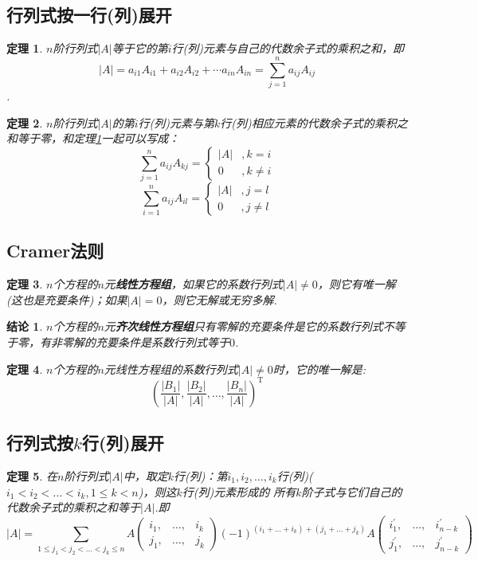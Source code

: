 \documentclass[UTF8]{article}
\newtheorem{thrm}{定理}[subsection]
\newtheorem{ccl}{结论}[subsection]
\begin{document}
\subsection{行列式按一行(列)展开}
\begin{thrm}\label{thrm:238}
  $n$阶行列式$|A|$等于它的第$i$行(列)元素与自己的代数余子式的乘积之和，即
  $$|A|=a_{i1}A_{i1}+a_{i2}A_{i2}+\cdots a_{in}A_{in}=\sum\limits_{j=1}^na_{ij}A_{ij}$$.
\end{thrm}
\begin{thrm}
  $n$阶行列式$|A|$的第$i$行(列)元素与第$k$行(列)相应元素的代数余子式的乘积之和等于零，和定理\ref{thrm:238}一起可以写成：
  \[
  \sum_{j=1}^na_{ij}A_{kj}=
  \begin{cases}
    |A| &,k=i \\
    0 &,k\ne i
  \end{cases}
  \]
  \[
  \sum_{i=1}^na_{ij}A_{il}=
  \begin{cases}
    |A| &,j=l \\
    0 &,j\ne l
  \end{cases}
  \]
\end{thrm}

\subsection{Cramer法则}
\begin{thrm}
  $n$个方程的$n$元\textbf{线性方程组}，如果它的系数行列式$|A|\ne 0$，则它有唯一解(这也是充要条件)；如果$|A|=0$，则它无解或无穷多解.
\end{thrm}
\begin{ccl}
  $n$个方程的$n$元\textbf{齐次线性方程组}只有零解的充要条件是它的系数行列式不等于零，有非零解的充要条件是系数行列式等于$0$.
\end{ccl}
\begin{thrm}
  $n$个方程的$n$元线性方程组的系数行列式$|A|\ne 0$时，它的唯一解是:
  \[
  \left( \frac{|B_1|}{|A|},\frac{|B_2|}{|A|},\ldots,\frac{|B_n|}{|A|} \right)^\mathrm{T}
  \]
\end{thrm}

\subsection{行列式按$k$行(列)展开}
\begin{thrm}
  在$n$阶行列式$|A|$中，取定$k$行(列)：第$i_1,i_2,\ldots,i_k$行(列)($i_1<i_2<\ldots<i_k,1\le k<n$)，则这$k$行(列)元素形成的
  所有$k$阶子式与它们自己的代数余子式的乘积之和等于$|A|$.即
  \[
  |A|=\sum_{1\le j_1<j_2<\ldots<j_k\le n}A \begin{pmatrix} i_1,& \ldots ,& i_k \\ j_1,& \ldots ,&j_k \end{pmatrix} (-1)^{(i_1+\ldots+i_k)+
  (j_1+\ldots+j_k)} A \begin{pmatrix} i^{'}_1,& \ldots ,& i^{'}_{n-k} \\ j^{'}_1,& \ldots ,&j^{'}_{n-k} \end{pmatrix}
  \]
\end{thrm}
\end{document}
